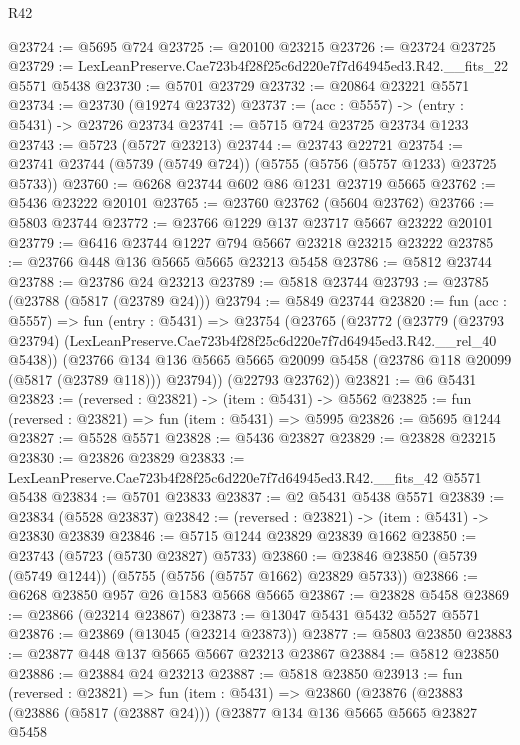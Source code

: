 \begin{lexlean}{R42}
\begin{coremodule}
@23724 := @5695 @724
@23725 := @20100 @23215
@23726 := @23724 @23725
@23729 := LexLeanPreserve.Cae723b4f28f25c6d220e7f7d64945ed3.R42.__fits_22 @5571 @5438
@23730 := @5701 @23729
@23732 := @20864 @23221 @5571
@23734 := @23730 (@19274 @23732)
@23737 := (acc : @5557) -> (entry : @5431) -> @23726 @23734
@23741 := @5715 @724 @23725 @23734 @1233
@23743 := @5723 (@5727 @23213)
@23744 := @23743 @22721
@23754 := @23741 @23744 (@5739 (@5749 @724)) (@5755 (@5756 (@5757 @1233) @23725 @5733))
@23760 := @6268 @23744 @602 @86 @1231 @23719 @5665
@23762 := @5436 @23222 @20101
@23765 := @23760 @23762 (@5604 @23762)
@23766 := @5803 @23744
@23772 := @23766 @1229 @137 @23717 @5667 @23222 @20101
@23779 := @6416 @23744 @1227 @794 @5667 @23218 @23215 @23222
@23785 := @23766 @448 @136 @5665 @5665 @23213 @5458
@23786 := @5812 @23744
@23788 := @23786 @24 @23213
@23789 := @5818 @23744
@23793 := @23785 (@23788 (@5817 (@23789 @24)))
@23794 := @5849 @23744
@23820 := fun (acc : @5557) =>
  fun (entry : @5431) =>
  @23754
    (@23765
      (@23772
        (@23779
          (@23793 @23794)
          (LexLeanPreserve.Cae723b4f28f25c6d220e7f7d64945ed3.R42.__rel_40 @5438))
        (@23766
          @134
          @136
          @5665
          @5665
          @20099
          @5458
          (@23786 @118 @20099 (@5817 (@23789 @118)))
          @23794))
      (@22793 @23762))
@23821 := @6 @5431
@23823 := (reversed : @23821) -> (item : @5431) -> @5562
@23825 := fun (reversed : @23821) => fun (item : @5431) => @5995
@23826 := @5695 @1244
@23827 := @5528 @5571
@23828 := @5436 @23827
@23829 := @23828 @23215
@23830 := @23826 @23829
@23833 := LexLeanPreserve.Cae723b4f28f25c6d220e7f7d64945ed3.R42.__fits_42 @5571 @5438
@23834 := @5701 @23833
@23837 := @2 @5431 @5438 @5571
@23839 := @23834 (@5528 @23837)
@23842 := (reversed : @23821) -> (item : @5431) -> @23830 @23839
@23846 := @5715 @1244 @23829 @23839 @1662
@23850 := @23743 (@5723 (@5730 @23827) @5733)
@23860 := @23846 @23850 (@5739 (@5749 @1244)) (@5755 (@5756 (@5757 @1662) @23829 @5733))
@23866 := @6268 @23850 @957 @26 @1583 @5668 @5665
@23867 := @23828 @5458
@23869 := @23866 (@23214 @23867)
@23873 := @13047 @5431 @5432 @5527 @5571
@23876 := @23869 (@13045 (@23214 @23873))
@23877 := @5803 @23850
@23883 := @23877 @448 @137 @5665 @5667 @23213 @23867
@23884 := @5812 @23850
@23886 := @23884 @24 @23213
@23887 := @5818 @23850
@23913 := fun (reversed : @23821) =>
  fun (item : @5431) =>
  @23860
    (@23876
      (@23883
        (@23886 (@5817 (@23887 @24)))
        (@23877
          @134
          @136
          @5665
          @5665
          @23827
          @5458

\end{coremodule}
\end{lexlean}
